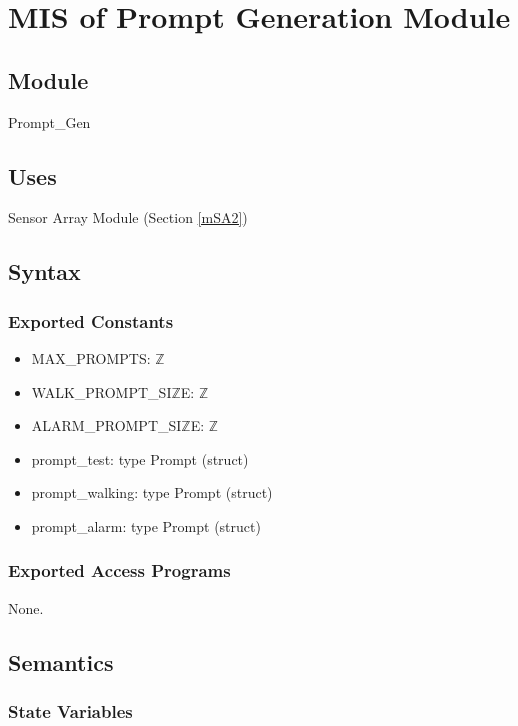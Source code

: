 \documentclass[12pt, titlepage]{article}
\begin{document}
\newpage




\section{MIS of Prompt Generation Module} \label{mPG} 

\subsection{Module}

Prompt\_Gen

\subsection{Uses}

Sensor Array Module (Section \ref{mSA2})

\subsection{Syntax}

\subsubsection{Exported Constants}
\begin{itemize}
\item MAX\_PROMPTS: $\mathbb{Z}$
\item WALK\_PROMPT\_SI$\mathbb{Z}$E: $\mathbb{Z}$
\item ALARM\_PROMPT\_SI$\mathbb{Z}$E: $\mathbb{Z}$
\item prompt\_test: type Prompt (struct)
\item prompt\_walking: type Prompt (struct)
\item prompt\_alarm: type Prompt (struct)
\end{itemize}

\subsubsection{Exported Access Programs}

None.

\subsection{Semantics}

\subsubsection{State Variables}
\end{document}
